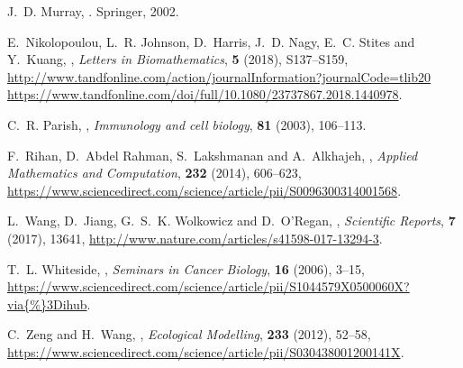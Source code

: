 \documentclass{aims}
\theoremstyle{definition}
\begin{document}
\begin{thebibliography}{10}
\newblock J.~D. Murray,
.
\newblock Springer, 2002.

\newblock E.~Nikolopoulou, L.~R. Johnson, D.~Harris, J.~D. Nagy, E.~C. Stites
  and Y.~Kuang,
,
\newblock \emph{Letters in Biomathematics}, \textbf{5} (2018), S137--S159,
\newblock
  \urlprefix\url{http://www.tandfonline.com/action/journalInformation?journalCode=tlib20
  https://www.tandfonline.com/doi/full/10.1080/23737867.2018.1440978}.

\newblock C.~R. Parish,
,
\newblock \emph{Immunology and cell biology}, \textbf{81} (2003), 106--113.

\newblock F.~Rihan, D.~{Abdel Rahman}, S.~Lakshmanan and A.~Alkhajeh,
,
\newblock \emph{Applied Mathematics and Computation}, \textbf{232} (2014),
  606--623,
\newblock
  \urlprefix\url{https://www.sciencedirect.com/science/article/pii/S0096300314001568}.

\newblock L.~Wang, D.~Jiang, G.~S.~K. Wolkowicz and D.~O'Regan,
,
\newblock \emph{Scientific Reports}, \textbf{7} (2017), 13641,
\newblock \urlprefix\url{http://www.nature.com/articles/s41598-017-13294-3}.

\newblock T.~L. Whiteside,
,
\newblock \emph{Seminars in Cancer Biology}, \textbf{16} (2006), 3--15,
\newblock
  \urlprefix\url{https://www.sciencedirect.com/science/article/pii/S1044579X0500060X?via{\%}3Dihub}.

\newblock C.~Zeng and H.~Wang,
,
\newblock \emph{Ecological Modelling}, \textbf{233} (2012), 52--58,
\newblock
  \urlprefix\url{https://www.sciencedirect.com/science/article/pii/S030438001200141X}.

\end{thebibliography}
\end{document}
